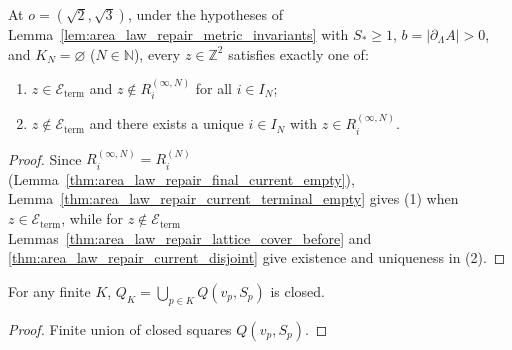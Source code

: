 \begin{lemma}
    \label{thm:area_law_repair_final_lattice_partition_empty}
    \leanok
    At $o=(\sqrt2,\sqrt3)$, under the hypotheses of Lemma~\ref{lem:area_law_repair_metric_invariants}
    with $S_*\ge1$, $b=|\partial_\Lambda A|>0$, and $K_N=\varnothing$ ($N\in\mathbb N$), every
    $z\in\mathbb Z^2$ satisfies exactly one of:
    \begin{enumerate}
        \item $z\in\mathcal E_{\mathrm{term}}$ and $z\notin R_i^{(\infty,N)}$ for all $i\in I_N$;
        \item $z\notin\mathcal E_{\mathrm{term}}$ and there exists a unique $i\in I_N$ with
              $z\in R_i^{(\infty,N)}$.
    \end{enumerate}
\end{lemma}

\begin{proof}
    \leanok
    Since $R_i^{(\infty,N)}=R_i^{(N)}$ (Lemma~\ref{thm:area_law_repair_final_current_empty}),
    Lemma~\ref{thm:area_law_repair_current_terminal_empty} gives (1) when
    $z\in\mathcal E_{\mathrm{term}}$, while for $z\notin\mathcal E_{\mathrm{term}}$
    Lemmas~\ref{thm:area_law_repair_lattice_cover_before} and
    \ref{thm:area_law_repair_current_disjoint} give existence and uniqueness in (2).
\end{proof}

\begin{lemma}
    \label{thm:area_law_repair_removal_closed}
    \leanok
    For any finite $K$, $Q_K=\bigcup_{p\in K}Q(v_p,S_p)$ is closed.
\end{lemma}
\begin{proof}\leanok
    Finite union of closed squares $Q(v_p,S_p)$.
\end{proof}


